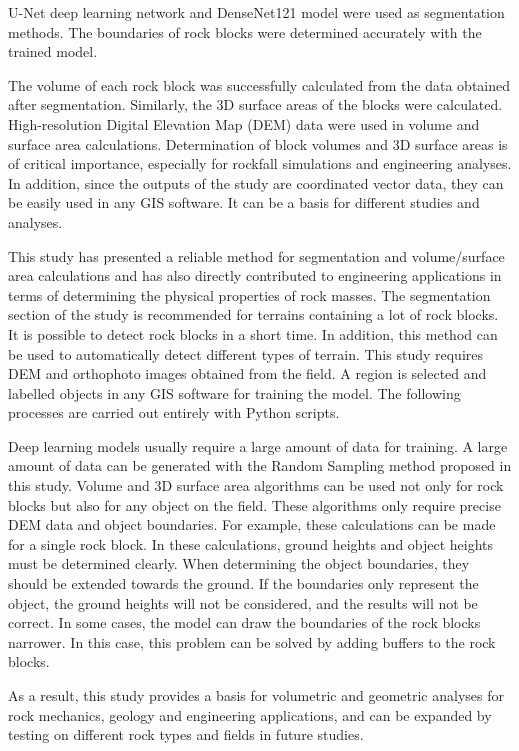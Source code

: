 \documentclass[a4paper,fleqn]{cas-sc}
\begin{document}
U-Net deep learning network and DenseNet121 model were used as segmentation methods. The boundaries of rock blocks were determined accurately with the trained model.

The volume of each rock block was successfully calculated from the data obtained after segmentation. Similarly, the 3D surface areas of the blocks were calculated. High-resolution Digital Elevation Map (DEM) data were used in volume and surface area calculations. Determination of block volumes and 3D surface areas is of critical importance, especially for rockfall simulations and engineering analyses. In addition, since the outputs of the study are coordinated vector data, they can be easily used in any GIS software. It can be a basis for different studies and analyses.

This study has presented a reliable method for segmentation and volume/surface area calculations and has also directly contributed to engineering applications in terms of determining the physical properties of rock masses. The segmentation section of the study is recommended for terrains containing a lot of rock blocks. It is possible to detect rock blocks in a short time. In addition, this method can be used to automatically detect different types of terrain. This study requires DEM and orthophoto images obtained from the field. A region is selected and labelled objects in any GIS software for training the model. The following processes are carried out entirely with Python scripts.

Deep learning models usually require a large amount of data for training. A large amount of data can be generated with the Random Sampling method proposed in this study. Volume and 3D surface area algorithms can be used not only for rock blocks but also for any object on the field. These algorithms only require precise DEM data and object boundaries. For example, these calculations can be made for a single rock block. In these calculations, ground heights and object heights must be determined clearly. When determining the object boundaries, they should be extended towards the ground. If the boundaries only represent the object, the ground heights will not be considered, and the results will not be correct. In some cases, the model can draw the boundaries of the rock blocks narrower. In this case, this problem can be solved by adding buffers to the rock blocks.

As a result, this study provides a basis for volumetric and geometric analyses for rock mechanics, geology and engineering applications, and can be expanded by testing on different rock types and fields in future studies.
\end{document}
